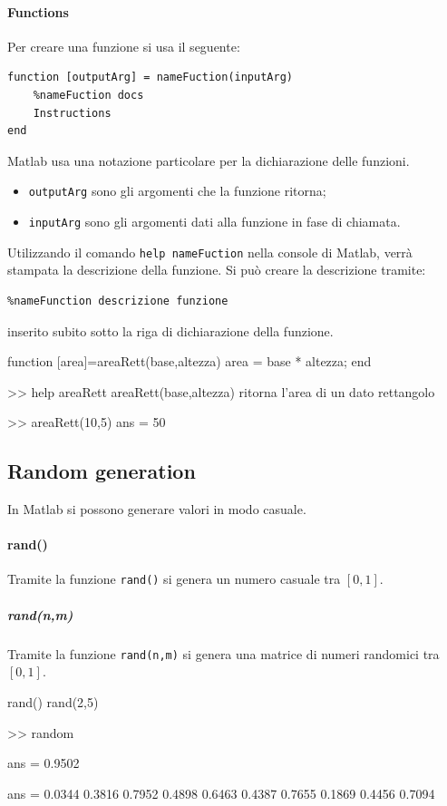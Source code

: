 \paragraph{Functions}
Per creare una funzione si usa il seguente:
\begin{verbatim}
function [outputArg] = nameFuction(inputArg)
    %nameFuction docs
    Instructions
end
\end{verbatim}
Matlab usa una notazione particolare per la dichiarazione delle funzioni.
\begin{itemize}
    \item \verb|outputArg| sono gli argomenti che la funzione ritorna;
    \item \verb|inputArg| sono gli argomenti dati alla funzione in fase di chiamata.
\end{itemize}
\begin{note}
Utilizzando il comando \verb|help nameFuction| nella console di Matlab, verrà stampata la descrizione della funzione. Si può creare la descrizione tramite:
\begin{verbatim}
%nameFunction descrizione funzione
\end{verbatim}
inserito subito sotto la riga di dichiarazione della funzione.
\end{note}

\begin{matlab}
function [area]=areaRett(base,altezza)
    area = base * altezza;
end
\end{matlab}
\begin{matlabconsole}
>> help areaRett
 areaRett(base,altezza) ritorna l'area di un dato rettangolo

 >> areaRett(10,5)
ans =
    50
\end{matlabconsole}

\subsection{Random generation}
In Matlab si possono generare valori in modo casuale.

\paragraph{rand()} Tramite la funzione \verb|rand()| si genera un numero casuale tra $ [0,1] $.
\subparagraph{rand(n,m)} Tramite la funzione \verb|rand(n,m)| si genera una matrice di numeri randomici tra $ [0,1] $.
\begin{matlab}
rand()
rand(2,5)
\end{matlab}
\begin{matlabconsole}
>> random

ans =
0.9502

ans =
0.0344  0.3816  0.7952  0.4898  0.6463
0.4387  0.7655  0.1869  0.4456  0.7094
\end{matlabconsole}

